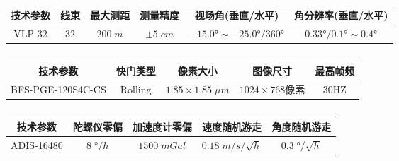 \begin{table*}[htbp]
  \centering
  \caption{}
  \label{tab:vlp32}
  \normf
  \begin{tabular}{c|ccccc}
    \hline
    {技术参数} & {线束} & {最大测距} & {测量精度} & {视场角(垂直/水平)}     & {角分辨率(垂直/水平)} \\ \hline
    {VLP-32}   & $32$   & $200\;m$   & $\pm5\;cm$ & $+15.0°\sim-25.0°/360°$ & $0.33°/0.1°\sim0.4°$  \\
    \hline
  \end{tabular}
\end{table*}
\begin{table*}[htbp]
  \centering
  \caption{}
  \label{tab:camera}
  \normf
  \begin{tabular}{c|cccc}
    \hline
    {技术参数}             & {快门类型}            & {像素大小} & {图像尺寸} & {最高帧频} \\ \hline
    {BFS-PGE-120S4C-CS}    &
    Rolling                & $
    1.85\times1.85\;\mu m$ & $1024\times768${像素} & 30HZ                                 \\ 	\hline
  \end{tabular}
\end{table*}
\begin{table*}[htbp]
  \centering
  \caption{}
  \label{tab:imu}
  \normf
  \begin{tabular}{c|cccc}
    \hline
    {技术参数}   & {陀螺仪零偏} & {加速度计零偏} & {速度随机游走}       & {角度随机游走}    \\ \hline
    {ADIS-16480} & $8\;°/h$     & $1500\;mGal$   & $0.18\;m/s/\sqrt{h}$ & $0.3\;°/\sqrt{h}$ \\ 	\hline
  \end{tabular}
\end{table*}

